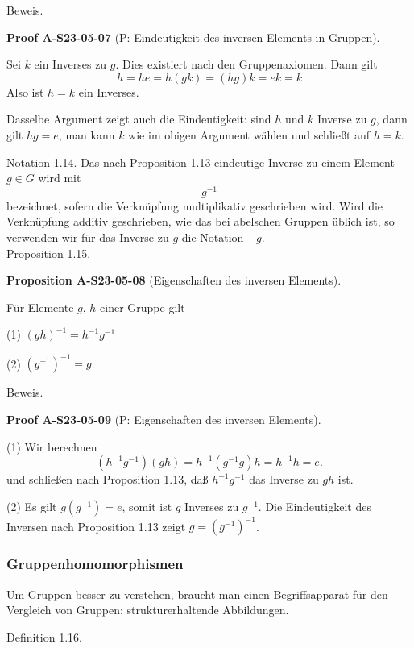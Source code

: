 \documentclass[10pt, letterpaper]{article}
\newcommand{\CustomHeading}[3]{%
  \par\medskip\noindent%
  \textbf{#1 #2} \textnormal{(#3)}.\enskip%
}
\newenvironment{PROP}[2]{\begin{unitbox}\CustomHeading{Proposition}{#1}{#2}}{\end{unitbox}}
\newenvironment{PROOF}[2]{\begin{unitbox}\CustomHeading{Proof}{#1}{#2}}{\end{unitbox}}
\begin{document}
Beweis. 


\begin{PROOF}{A-S23-05-07}{P: Eindeutigkeit des inversen Elements in Gruppen}
Sei $k$ ein Inverses zu $g$. Dies existiert nach den Gruppenaxiomen. Dann gilt
$$
h=h e=h(g k)=(h g) k=e k=k
$$
Also ist $h=k$ ein Inverses.
\end{PROOF}


Dasselbe Argument zeigt auch die Eindeutigkeit: sind $h$ und $k$ Inverse zu $g$, dann gilt $h g=e$, man kann $k$ wie im obigen Argument wählen und schließt auf $h=k$.

Notation 1.14. Das nach Proposition 1.13 eindeutige Inverse zu einem Element $g \in G$ wird mit
$$
g^{-1}
$$
bezeichnet, sofern die Verknüpfung multiplikativ geschrieben wird. Wird die Verknüpfung additiv geschrieben, wie das bei abelschen Gruppen üblich ist, so verwenden wir für das Inverse zu $g$ die Notation $-g$.\\


Proposition 1.15. 

\begin{PROP}{A-S23-05-08}{Eigenschaften des inversen Elements}
Für Elemente $g$, $h$ einer Gruppe gilt

(1) $(g h)^{-1}=h^{-1} g^{-1}$

(2) $\left(g^{-1}\right)^{-1}=g$.
\end{PROP}

Beweis. 

\begin{PROOF}{A-S23-05-09}{P: Eigenschaften des inversen Elements}
(1) Wir berechnen
$$
\left(h^{-1} g^{-1}\right)(g h)=h^{-1}\left(g^{-1} g\right) h=h^{-1} h=e .
$$
und schließen nach Proposition 1.13, daß $h^{-1} g^{-1}$ das Inverse zu $g h$ ist.


(2) Es gilt $g\left(g^{-1}\right)=e$, somit ist $g$ Inverses zu $g^{-1}$. Die Eindeutigkeit des Inversen nach Proposition 1.13 zeigt $g=\left(g^{-1}\right)^{-1}$.
\end{PROOF}



\subsubsection{Gruppenhomomorphismen}


Um Gruppen besser zu verstehen, braucht man einen Begriffsapparat für den Vergleich von Gruppen: strukturerhaltende Abbildungen.

Definition 1.16. 
\end{document}
